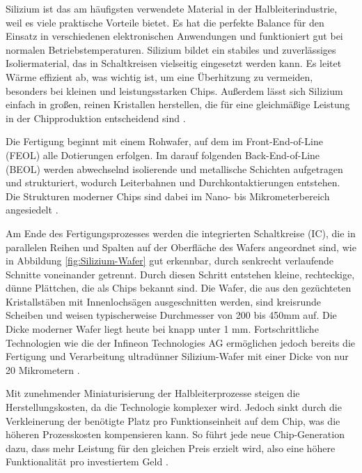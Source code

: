 Silizium ist das am häufigsten verwendete Material in der Halbleiterindustrie, weil es viele praktische Vorteile bietet. Es hat die perfekte Balance für den Einsatz in verschiedenen elektronischen Anwendungen und funktioniert gut bei normalen Betriebstemperaturen. Silizium bildet ein stabiles und zuverlässiges Isoliermaterial, das in Schaltkreisen vielseitig eingesetzt werden kann. Es leitet Wärme effizient ab, was wichtig ist, um eine Überhitzung zu vermeiden, besonders bei kleinen und leistungsstarken Chips. Außerdem lässt sich Silizium einfach in großen, reinen Kristallen herstellen, die für eine gleichmäßige Leistung in der Chipproduktion entscheidend sind \cite{lienig2023halbleitertechnologie}.

Die Fertigung beginnt mit einem Rohwafer, auf dem im Front-End-of-Line (FEOL) alle Dotierungen erfolgen. Im darauf folgenden Back-End-of-Line (BEOL) werden abwechselnd isolierende und metallische Schichten aufgetragen und strukturiert, wodurch Leiterbahnen und Durchkontaktierungen entstehen. Die Strukturen moderner Chips sind dabei im Nano- bis Mikrometerbereich angesiedelt \cite{lienig2023halbleitertechnologie}.

Am Ende des Fertigungsprozesses werden die integrierten Schaltkreise (\gls{IC}), die in parallelen Reihen und Spalten auf der Oberfläche des Wafers angeordnet sind, wie in Abbildung \ref{fig:Silizium-Wafer} gut erkennbar, durch senkrecht verlaufende Schnitte voneinander getrennt. Durch diesen Schritt entstehen kleine, rechteckige, dünne Plättchen, die als Chips bekannt sind. Die Wafer, die aus den gezüchteten Kristallstäben mit Innenlochsägen ausgeschnitten werden, sind kreisrunde Scheiben und weisen typischerweise Durchmesser von 200 bis 450mm auf. Die Dicke moderner Wafer liegt heute bei knapp unter 1 mm. Fortschrittliche Technologien wie die der Infineon Technologies AG ermöglichen jedoch bereits die Fertigung und Verarbeitung ultradünner Silizium-Wafer mit einer Dicke von nur 20 Mikrometern \cite{infineon2024dünnsterWafer}.

Mit zunehmender Miniaturisierung der Halbleiterprozesse steigen die Herstellungskosten, da die Technologie komplexer wird. Jedoch sinkt durch die Verkleinerung der benötigte Platz pro Funktionseinheit auf dem Chip, was die höheren Prozesskosten kompensieren kann. So führt jede neue Chip-Generation dazu, dass mehr Leistung für den gleichen Preis erzielt wird, also eine höhere Funktionalität pro investiertem Geld \cite{lienig2023halbleitertechnologie}.